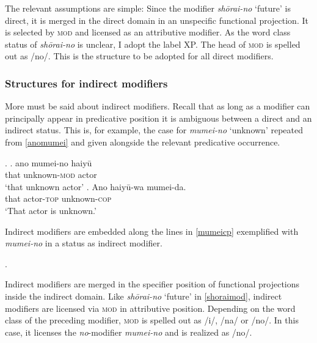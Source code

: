\documentclass [output=book,colorlinks,citecolor=brown]{langscibook}
\begin{document}
The relevant assumptions are simple: Since the modifier \textit{shōrai-no} `future’ is direct, it is merged in the direct domain in an unspecific functional projection. It is selected by \textsc{mod} and licensed as an attributive modifier. As the word class status of \textit{shōrai-no} is unclear, I adopt the label XP. The head of \textsc{mod} is spelled out as /no/. This is the structure to be adopted for all direct modifiers.

\subsubsection{Structures for indirect modifiers} \label{indirect mod}

More must be said about indirect modifiers. Recall that as long as a modifier can principally appear in predicative position it is ambiguous between a direct and an indirect status. This is, for example, the case for \textit{mumei-no} `unknown’ repeated from \ref{anomumei} and given alongside the relevant predicative occurrence. %

\ex. \ag. ano mumei-no haiyū\\
that unknown-\textsc{mod} actor\\
`that unknown actor’
\bg. Ano haiyū-wa mumei-da.\\
that actor-\textsc{top} unknown-\textsc{cop}\\
`That actor is unknown.’

 Indirect modifiers are embedded along the lines in \ref{mumeicp} exemplified with \textit{mumei-no} in a status as indirect modifier.

\ex. \label{mumeicp} 

Indirect modifiers are merged in the specifier position of functional projections inside the indirect domain. Like \textit{shōrai-no} `future’ in \ref{shoraimod}, indirect modifiers are licensed via \textsc{mod} in attributive position. Depending on the word class of the preceding modifier, \textsc{mod} is spelled out as /i/, /na/ or /no/. In this case, it licenses the \textit{no}-modifier \textit{mumei-no} and is realized as /no/.
\end{document}
